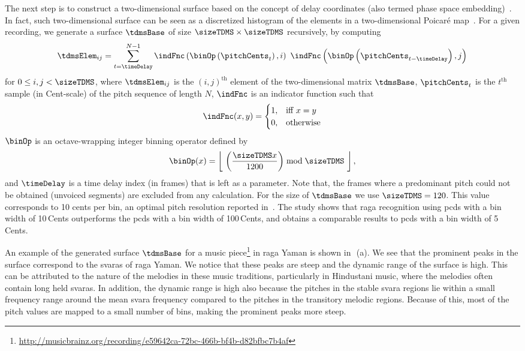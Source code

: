 The next step is to construct a two-dimensional surface based on the concept of delay coordinates (also termed phase space embedding)~\citep{takens1981detecting, Kantz04BOOK}. In fact, such two-dimensional surface can be seen as a discretized histogram of the elements in a two-dimensional Poicar\'e map~\citep{Kantz04BOOK}. For a given recording, we generate a surface $\tdmsBase$ of size $\sizeTDMS\times\sizeTDMS$ recursively, by computing
\begin{equation}
\label{eq:surface_computation1}	
\tdmsElem_{ij} = \sum_{t=\timeDelay}^{N-1} \indFnc\left(\binOp\left(\pitchCents_t\right),i\right)~ \indFnc\left(\binOp\left(\pitchCents_{t-\timeDelay}\right),j\right) 
\end{equation}
for $0 \leq i,j < \sizeTDMS$, where $\tdmsElem_{ij}$ is the $(i,j)^\mathrm{th}$ element of the two-dimensional matrix $\tdmsBase$, $\pitchCents_t$ is the $t^\mathrm{th}$ sample (in Cent-scale) of the pitch sequence of length $N$, $\indFnc$ is an indicator function such that
\begin{equation}
\begin{aligned}
\indFnc(x,y)=
\begin{cases}
1, & \text{iff } x=y\\
0, & \text{otherwise}
\end{cases}
\end{aligned}
\end{equation} 
$\binOp$ is an octave-wrapping integer binning operator defined by 
\begin{equation}	
\label{eq:binning_function}	
\binOp(x) = \left\lfloor ~\left(\frac{\sizeTDMS x}{1200}\right) \bmod \sizeTDMS ~\right\rfloor,
\end{equation}
and $\timeDelay$ is a time delay index (in frames) that is left as a parameter. Note that, the frames where a predominant pitch could not be obtained (unvoiced segments) are excluded from any calculation. For the size of $\tdmsBase$ we use $\sizeTDMS = 120$. This value  corresponds to 10 cents per bin, an optimal pitch resolution reported in~\citep{chordia2013joint}. The study shows that \gls{raga} recognition using \glspl{pcd} with a bin width of 10\,Cents outperforms the \glspl{pcd} with a bin width of 100\,Cents, and obtains a comparable results to \glspl{pcd} with a bin width of 5\,Cents.

An example of the generated surface $\tdmsBase$ for a music piece\footnote{\url{http://musicbrainz.org/recording/e59642ca-72bc-466b-bf4b-d82bfbc7b4af}} in \gls{raga} Yaman is shown in~\,(a). We see that the prominent peaks in the surface correspond to the \glspl{svara} of \gls{raga} Yaman. We notice that these peaks are steep and the dynamic range of the surface is high. This can be attributed to the nature of the melodies in these music traditions, particularly in Hindustani music, where the melodies often contain long held \glspl{svara}. In addition, the dynamic range is high also because the pitches in the stable \gls{svara} regions lie within a small frequency range around the mean \gls{svara} frequency compared to the pitches in the transitory melodic regions. Because of this, most of the pitch values are mapped to a small number of bins, making the prominent peaks more steep.

